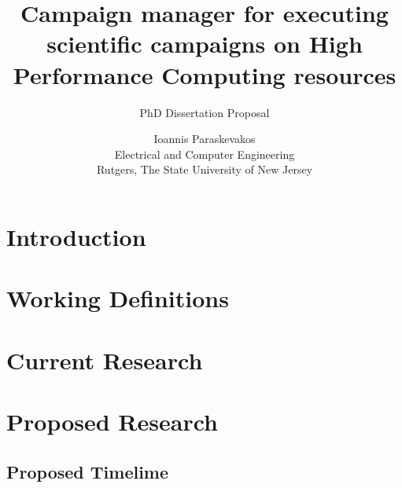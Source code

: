 

\title{Campaign manager for executing scientific campaigns on High Performance Computing resources}
\subtitle{PhD Dissertation Proposal}
\author{Ioannis Paraskevakos \\	Electrical and Computer Engineering \\
        Rutgers, The State University of New Jersey}
\date{}

\maketitle


\section{Introduction}


\section{Working Definitions}


\section{Current Research}


\section{Proposed Research}

\label{sec:proposed}

\subsection{Proposed Timelime}




